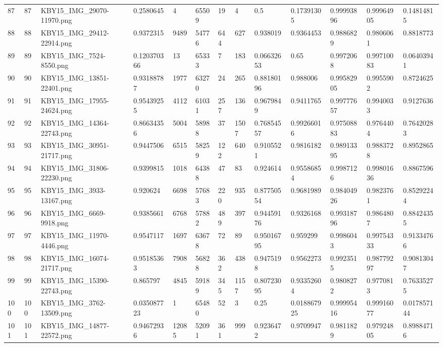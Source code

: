 \documentclass[11pt, a4paper, twoside]{report}
\begin{document}
\begin{longtable}[c]{@{}lllllllllllll@{}}
87 & 87 & KBY15\_IMG\_29070-11970.png & 0.2580645 & 4 & 65509 & 19 & 4 & 0.5 & 0.17391305 & 0.99993896 & 0.99964905 & 0.14814815 \\
88 & 88 & KBY15\_IMG\_29412-22914.png & 0.9372315 & 9489 & 54776 & 644 & 627 & 0.938019 & 0.9364453 & 0.9886829 & 0.9806061 & 0.8818773 \\
89 & 89 & KBY15\_IMG\_7524-8550.png & 0.120370366 & 13 & 65333 & 7 & 183 & 0.06632653 & 0.65 & 0.9972068 & 0.99710083 & 0.06403941 \\
90 & 90 & KBY15\_IMG\_13851-22401.png & 0.93188787 & 1977 & 63270 & 24 & 265 & 0.88180196 & 0.988006 & 0.99582905 & 0.9955902 & 0.8724625 \\
91 & 91 & KBY15\_IMG\_17955-24624.png & 0.95439255 & 4112 & 61031 & 257 & 136 & 0.9679849 & 0.9411765 & 0.99777657 & 0.9940033 & 0.9127636 \\
92 & 92 & KBY15\_IMG\_14364-22743.png & 0.86634356 & 5004 & 58988 & 37 & 1507 & 0.76854557 & 0.99266016 & 0.97508883 & 0.9764404 & 0.76420283 \\
93 & 93 & KBY15\_IMG\_30951-21717.png & 0.9447506 & 6515 & 58259 & 122 & 640 & 0.9105521 & 0.9816182 & 0.98913395 & 0.9883728 & 0.8952865 \\
94 & 94 & KBY15\_IMG\_31806-22230.png & 0.9399815 & 1018 & 64388 & 47 & 83 & 0.924614 & 0.95586854 & 0.9987126 & 0.99801636 & 0.8867596 \\
95 & 95 & KBY15\_IMG\_3933-13167.png & 0.920624 & 6698 & 57683 & 220 & 935 & 0.87750554 & 0.9681989 & 0.98404926 & 0.9823761 & 0.85292244 \\
96 & 96 & KBY15\_IMG\_6669-9918.png & 0.9385661 & 6768 & 57882 & 489 & 397 & 0.94459176 & 0.9326168 & 0.99318796 & 0.9864807 & 0.88424355 \\
97 & 97 & KBY15\_IMG\_11970-4446.png & 0.9547117 & 1697 & 63678 & 72 & 89 & 0.95016795 & 0.959299 & 0.9986043 & 0.99754333 & 0.91334766 \\
98 & 98 & KBY15\_IMG\_16074-21717.png & 0.95185363 & 7908 & 56828 & 362 & 438 & 0.9475198 & 0.9562273 & 0.9923515 & 0.98779297 & 0.90813047 \\
99 & 99 & KBY15\_IMG\_15390-22743.png & 0.865797 & 4845 & 59189 & 345 & 1157 & 0.80723095 & 0.93352604 & 0.9808272 & 0.9770813 & 0.76335275 \\
100 & 100 & KBY15\_IMG\_3762-13509.png & 0.035087723 & 1 & 65480 & 52 & 3 & 0.25 & 0.018867925 & 0.99995416 & 0.99916077 & 0.017857144 \\
101 & 101 & KBY15\_IMG\_14877-22572.png & 0.94672936 & 12085 & 52091 & 361 & 999 & 0.9236472 & 0.9709947 & 0.9811829 & 0.97924805 & 0.89884716 \\

\end{longtable}
\end{document}
